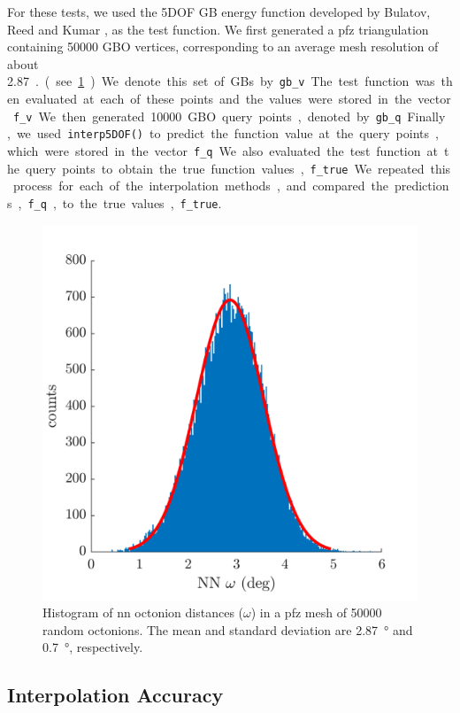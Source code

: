 \documentclass[preprint,12pt]{elsarticle}
\begin{document}
For these tests, we used the 5DOF GB energy function developed by Bulatov, Reed and Kumar \cite{bulatovGrainBoundaryEnergy2014}, as the test function. We first generated a \gls{pfz} triangulation containing \num{50000} GBO vertices, corresponding to an average mesh resolution of about \SI{2.87}{\degree.} (see \cref{fig:nndist}). We denote this set of GBs by \texttt{gb\_v}. The test function was then evaluated at each of these points and the values were stored in the vector \texttt{f\_v}. We then generated \num{10000} GBO query points, denoted by \texttt{gb\_q}. Finally, we used \texttt{interp5DOF()} to predict the function value at the query points, which were stored in the vector \texttt{f\_q}. We also evaluated the test function at the query points to obtain the true function values, \texttt{f\_true}. We repeated this process for each of the interpolation methods, and compared the predictions, \texttt{f\_q}, to the true values, \texttt{f\_true}.
\begin{figure}
\centering
\includegraphics[width=0.5\linewidth]{disthist50000.png}
\caption{Histogram of \gls{nn} octonion distances ($\omega$) in a \gls{pfz} mesh of \num{50000} random octonions. The mean and standard deviation are \SI{2.87}{\degree} and \SI{0.7}{\degree}, respectively.} %
\label{fig:nndist}
\end{figure}

\subsection{Interpolation Accuracy}
\label{sec:results:accuracy}
\end{document}
